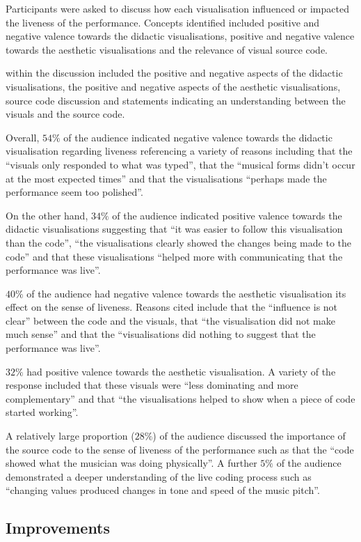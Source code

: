 Participants were asked to discuss how each visualisation influenced or impacted the liveness of the performance. Concepts identified included positive and negative valence towards the didactic visualisations, positive and negative valence towards the aesthetic visualisations and the relevance of visual source code. 

within the discussion included the positive and negative aspects of the didactic visualisations, the positive and negative aspects of the aesthetic visualisations, source code discussion and statements indicating an understanding between the visuals and the source code.

Overall, $54\%$ of the audience indicated negative valence towards the didactic visualisation regarding liveness referencing a variety of reasons including that the ``visuals only responded to what was typed'', that the ``musical forms didn't occur at the most expected times'' and that the visualisations ``perhaps made the performance seem too polished''.

On the other hand, $34\%$ of the audience indicated positive valence towards the didactic visualisations suggesting that ``it was easier to follow this visualisation than the code'', ``the visualisations clearly showed the changes being made to the code'' and that these visualisations ``helped more with communicating that the performance was live''.

$40\%$ of the audience had negative valence towards the aesthetic visualisation its effect on the sense of liveness. Reasons cited include that the ``influence is not clear'' between the code and the visuals, that ``the visualisation did not make much sense'' and that the ``visualisations did nothing to suggest that the performance was live''.

$32\%$ had positive valence towards the aesthetic visualisation. A variety of the response included that these visuals were ``less dominating and more complementary'' and that ``the visualisations helped to show when a piece of code started working''.

A relatively large proportion ($28\%$) of the audience discussed the importance of the source code to the sense of liveness of the performance such as that the ``code showed what the musician was doing physically''. A further $5\%$ of the audience demonstrated a deeper understanding of the live coding process such as ``changing values produced changes in tone and speed of the music pitch''.

\subsection{Improvements}
\label{section:improvements}

